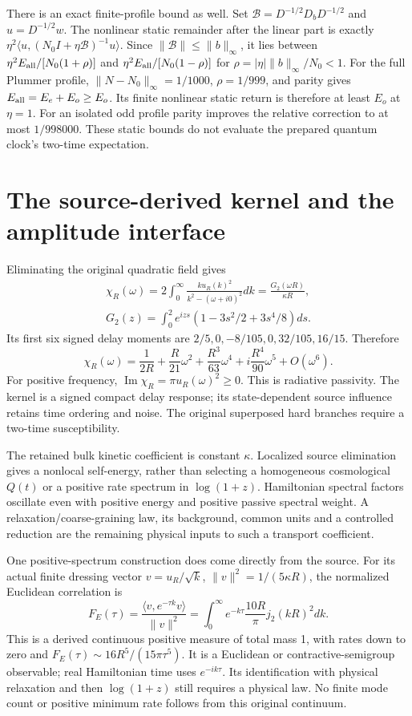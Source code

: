 There is an exact finite-profile bound as well.  Set
$\mathcal B=D^{-1/2}D_bD^{-1/2}$ and $u=D^{-1/2}w$. The nonlinear
static remainder after the linear part is exactly
$\eta^2\langle u,(N_0I+\eta\mathcal B)^{-1}u\rangle$.
Since $\|\mathcal B\|\le\|b\|_\infty$, it lies between
$\eta^2E_{\rm all}/[N_0(1+\rho)]$ and $\eta^2E_{\rm all}/[N_0(1-\rho)]$ for
$\rho=|\eta|\|b\|_\infty/N_0<1$.
For the full Plummer profile, $\|N-N_0\|_\infty=1/1000$, $\rho=1/999$,
and parity gives $E_{\rm all}=E_e+E_o\ge E_o$. Its finite nonlinear static
return is therefore at least $E_o$ at $\eta=1$.
For an isolated odd profile parity improves the relative correction to
at most $1/998000$. These static bounds do not evaluate the prepared
quantum clock's two-time expectation.

\section{The source-derived kernel and the amplitude interface}
Eliminating the original quadratic field gives
\[
 \begin{gathered}
 \chi_R(\omega)=2\int_0^\infty
 \frac{k u_R(k)^2}{k^2-(\omega+i 0)^2}dk
 =\frac{G_2(\omega R)}{\kappa R},\\
 G_2(z)=\int_0^2e^{izs}(1-3s^2/2+3s^4/8)ds.
 \end{gathered}
\]
Its first six signed delay moments are
$2/5,0,-8/105,0,32/105,16/15$. Therefore
\[
 \chi_R(\omega)=\frac 1{2R}+\frac R{21}\omega^2
 +\frac{R^3}{63}\omega^4+i\frac{R^4}{90}\omega^5+O(\omega^6).
\]
For positive frequency, $\operatorname{Im}\chi_R=\pi u_R(\omega)^2\ge 0$.
This is radiative passivity. The kernel is a signed compact delay response;
its state-dependent source influence retains time ordering and noise.
The original superposed hard branches require a two-time susceptibility.

The retained bulk kinetic coefficient is constant $\kappa$.
Localized source elimination gives a nonlocal self-energy, rather than
selecting a homogeneous cosmological $Q(t)$ or a positive rate spectrum
in $\log(1+z)$. Hamiltonian spectral factors oscillate even with positive
energy and positive passive spectral weight. A relaxation/coarse-graining
law, its background, common units and a controlled reduction are the
remaining physical inputs to such a transport coefficient.

One positive-spectrum construction does come directly from the source.
For its actual finite dressing vector $v=u_R/\sqrt{k}$,
$\|v\|^2=1/(5\kappa R)$, the normalized Euclidean correlation is
\[
 F_E(\tau)=\frac{\langle v,e^{-\tau k}v\rangle}{\|v\|^2}
  =\int_0^\infty e^{-k\tau}\frac{10R}{\pi}j_2(kR)^2dk.
\]
This is a derived continuous positive measure of total mass 1, with rates
down to zero and $F_E(\tau)\sim 16R^5/(15\pi\tau^5)$.
It is a Euclidean or contractive-semigroup observable; real Hamiltonian
time uses $e^{-ik\tau}$.  Its identification with physical relaxation and
then $\log(1+z)$ still requires a physical law.  No finite mode count or
positive minimum rate follows from this original continuum.

